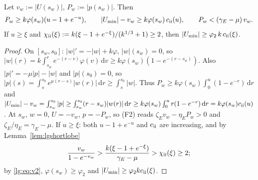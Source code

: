 \begin{lemma}[Phase (ii): $w<0$, $p<0$]\label{lg:lem:ii}
Let $v_w:=|U(s_w)|$, $P_w:=|p(s_w)|$. Then
\[
P_w\ge k\varphi(s_w)(u-1+e^{-u}),\qquad |U_{\min}|-v_w\ge k\varphi(s_w)\,c_{\rm ii}(u),\qquad
P_w<(\gamma_E-\mu)\,v_w .
\]
If $u\ge \xi$ and $\chi_{\rm ii}(\xi):=k(\xi-1+e^{-\xi})/(k^{1/3}+1)\ge2$, then $|U_{\min}|\ge\varphi_2\,k\,c_{\rm ii}(\xi)$.
\end{lemma}
\begin{proof}
On $[s_w,s_0]$: $|w|'=-|w|+k\varphi$, $|w|(s_w)=0$, so
$|w|(r)=k\int_{s_w}^re^{-(r-v)}\varphi(v)\,\mathrm dv\ge k\varphi(s_w)(1-e^{-(r-s_w)})$. Also
$|p|'=-\mu|p|-|w|$ and $|p|(s_0)=0$, so $|p|(s)=\int_s^{s_0}e^{\mu(r-s)}|w(r)|\,\mathrm dr\ge\int_s^{s_0}|w|$.
Thus $P_w\ge k\varphi(s_w)\int_0^u(1-e^{-r})\,\mathrm dr$ and
$|U_{\min}|-v_w=\int_{s_w}^{s_0}|p|\ge\int_{s_w}^{s_0}(r-s_w)|w(r)|\,\mathrm dr\ge k\varphi(s_w)\int_0^ur(1-e^{-r})\,\mathrm dr
=k\varphi(s_w)c_{\rm ii}(u)$. At $s_w$, $w=0$, $U=-v_w$, $p=-P_w$, so (F2) reads
$\zeta_Ev_w-\eta_EP_w>0$ and $\zeta_E/\eta_E=\gamma_E-\mu$.
If $u\ge \xi$: both $u-1+e^{-u}$ and $c_{\rm ii}$ are increasing, and by Lemma~\ref{lem:lgshortlobe}
\[
\frac{v_w}{1-e^{-v_w}}>\frac{k(\xi-1+e^{-\xi})}{\gamma_E-\mu}>\chi_{\rm ii}(\xi)\ge2 ;
\]
by \eqref{lg:eq:v2},
$\varphi(s_w)\ge\varphi_2$ and $|U_{\min}|\ge\varphi_2kc_{\rm ii}(\xi)$.
\end{proof}

